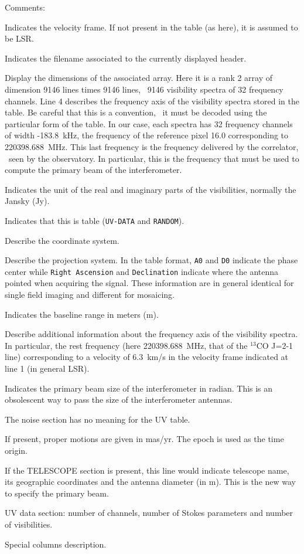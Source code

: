Comments:
\begin{description}\itemsep 0pt
\item[Line 1] Indicates the velocity frame. If not present in the table
(as here), it is assumed to be LSR.
\item[Line 2] Indicates the filename associated to the currently displayed
  header.
\item[Lines 3-5] Display the dimensions of the associated array. Here it is
  a rank 2 array of dimension 9146 lines times 9146 lines, \ie\ 9146 
  visibility spectra of 32 frequency channels.  Line
  4 describes the frequency axis of the visibility spectra stored in the
  \uv{} table. Be careful that this is a convention, \ie\ it must be
  decoded using the particular form of the table. In our case, each spectra
  has 32 frequency channels of width -183.8~kHz, the frequency of the
  reference pixel 16.0 corresponding to 220398.688~MHz. This last
  frequency is the frequency delivered by the correlator, \ie\ seen by the
  observatory. In particular, this is the frequency that must be used to
  compute the primary beam of the interferometer.
\item[Line 8] Indicates the unit of the real and imaginary parts of the
  visibilities, normally the Jansky (Jy).
\item[Line 9] Indicates that this is \uv{} table (\texttt{UV-DATA} and
  \texttt{RANDOM}).
\item[Lines 10-13] Describe the coordinate system.
\item[Lines 14-15] Describe the projection system. In the \uv{} table
  format, \texttt{A0} and \texttt{D0} indicate the phase center while
  \texttt{Right Ascension} and \texttt{Declination} indicate where the
  antenna pointed when acquiring the signal. These information are in
  general identical for single field imaging and different for mosaicing.
\item[Lines 16] Indicates the baseline range in meters (m). 
\item[Lines 17-19] Describe additional information about the frequency axis
  of the visibility spectra. In particular, the rest frequency (here
  220398.688~MHz, that of the $^{13}$CO J=2-1 line) corresponding to a 
  velocity of 6.3~km/s in the velocity frame indicated at line 1 (in general LSR).
\item[Line 20] Indicates the primary beam size of the interferometer in
  radian. This is an obsolescent way to pass the size of the interferometer
  antennas.
\item[Line 21] The noise section has no meaning for the UV table.
\item[Line 22] If present, proper motions are given in mas/yr. The epoch
is used as the time origin.
\item[Line 23] If the TELESCOPE section is present, this line would 
indicate telescope name, its geographic coordinates and the antenna 
diameter (in m). This is the new way to specify the primary beam.
\item[Line 24] UV data section: number of channels, number of Stokes
parameters and number of visibilities.
\item[Line 15 to end] Special columns description.
\end{description}


